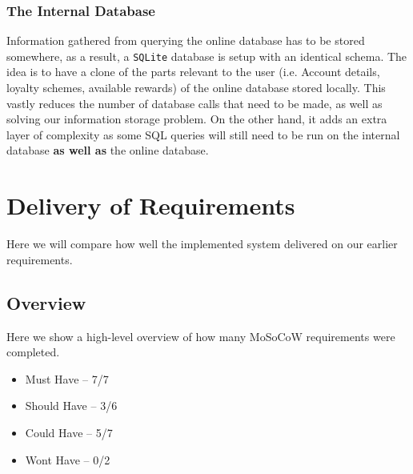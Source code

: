 \subsubsection{The Internal Database}
Information gathered from querying the online database has to be stored somewhere, as a result, a \texttt{SQLite} database is setup with an identical schema. The idea is to have a clone of the parts relevant to the user (i.e. Account details, loyalty schemes, available rewards) of the online database stored locally. This vastly reduces the number of database calls that need to be made, as well as solving our information storage problem. On the other hand, it adds an extra layer of complexity as some SQL queries will still need to be run on the internal database \textbf{as well as} the online database. 
\section{Delivery of Requirements}
Here we will compare how well the implemented system delivered on our earlier requirements.

\subsection{Overview}
Here we show a high-level overview of how many MoSoCoW requirements were completed. 
\begin{itemize}
	\item Must Have -- 7/7
	\item Should Have -- 3/6
	\item Could Have -- 5/7
	\item Wont Have -- 0/2
\end{itemize}

